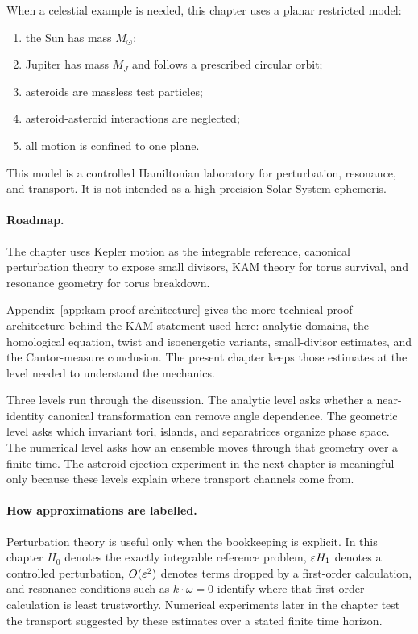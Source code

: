 \begin{assumption}
When a celestial example is needed, this chapter uses a planar restricted
model:
\begin{enumerate}
\item the Sun has mass \(M_\odot\);
\item Jupiter has mass \(M_J\) and follows a prescribed circular orbit;
\item asteroids are massless test particles;
\item asteroid-asteroid interactions are neglected;
\item all motion is confined to one plane.
\end{enumerate}
This model is a controlled Hamiltonian laboratory for perturbation, resonance,
and transport. It is not intended as a high-precision Solar System ephemeris.
\end{assumption}

\paragraph{Roadmap.}
The chapter uses Kepler motion as the integrable reference, canonical
perturbation theory to expose small divisors, KAM theory for torus survival,
and resonance geometry for torus breakdown.

Appendix~\ref{app:kam-proof-architecture} gives the more technical proof
architecture behind the KAM statement used here: analytic domains, the
homological equation, twist and isoenergetic variants, small-divisor estimates,
and the Cantor-measure conclusion. The present chapter keeps those estimates at
the level needed to understand the mechanics.

Three levels run through the discussion. The analytic level asks whether a
near-identity canonical transformation can remove angle dependence. The
geometric level asks which invariant tori, islands, and separatrices organize
phase space. The numerical level asks how an ensemble moves through that
geometry over a finite time. The asteroid ejection experiment in the next
chapter is meaningful only because these levels explain where transport
channels come from.

\paragraph{How approximations are labelled.}
Perturbation theory is useful only when the bookkeeping is explicit. In this
chapter \(H_0\) denotes the exactly integrable reference problem, \(\varepsilon H_1\)
denotes a controlled perturbation, \(O(\varepsilon^2)\) denotes terms dropped by a
first-order calculation, and resonance conditions such as \(k\cdot\omega=0\)
identify where that first-order calculation is least trustworthy. Numerical
experiments later in the chapter test the transport suggested by these
estimates over a stated finite time horizon.

